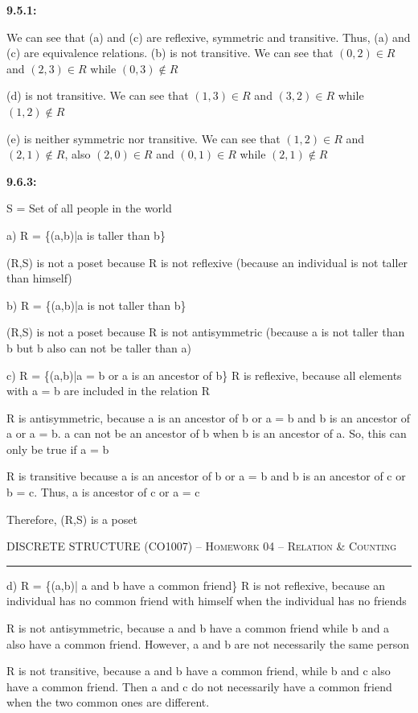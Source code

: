 \documentclass[12pt]{amsart}
\begin{document}
\textbf{9.5.1: }

We can see that (a) and (c) are reflexive, symmetric and transitive. Thus, (a) and (c) are equivalence relations.
(b) is not transitive. We can see that $(0,2)\in R$ and  $(2,3)\in R$ while $(0,3)\notin R$

(d) is not transitive. We can see that $(1,3)\in R$ and  $(3,2)\in R$ while $(1,2)\notin R$

(e) is neither symmetric nor transitive. We can see that $(1,2)\in R$ and $(2,1)\notin R$, also $(2,0)\in R$ and  $(0,1)\in R$ while $(2,1)\notin R$

\textbf{9.6.3: }

S = Set of all people in the world

a) R = \{(a,b)|a is taller than b\}

(R,S) is not a poset because R is not reflexive (because an individual is not taller than himself)

b) R = \{(a,b)|a is not taller than b\}

(R,S) is not a poset because R is not antisymmetric (because a is not taller than b but b also can not be taller than a)

c) R = \{(a,b)|a = b or a is an ancestor of b\}
R is reflexive, because all elements with a = b are included in the relation R

R is antisymmetric, because a is an ancestor of b or a = b and b is an ancestor of a or a = b. a can not be an ancestor of b when b is an ancestor of a. So, this can only be true if a = b

R is transitive because a is an ancestor of b or a = b and b is an ancestor of c or b = c. Thus, a is ancestor of c or a = c

Therefore, (R,S) is a poset
\newpage

{\scshape } \hfill {\scshape DISCRETE STRUCTURE (CO1007) -- Homework 04 -- Relation \& Counting} \hfill {\scshape }
 
\smallskip

\hrule

\bigskip
d) R = \{(a,b)| a and b have a common friend\}
R is not reflexive, because an individual has no common friend with himself when the individual has no friends

R is not antisymmetric, because a and b have a common friend while b and a also have a common friend. However, a and b  are not necessarily the same person

R is not transitive, because a and b have a common friend, while b and c also have a common friend. Then a and c do not necessarily have a common friend when the two common ones are different.
\end{document}
